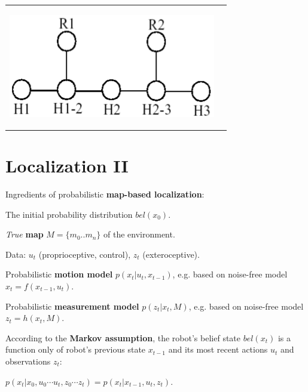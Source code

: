 \documentclass[landscape]{article}
\newcommand{\vmspace}{\vspace{-7pt}}
\newcommand{\vpspace}{\vspace{5pt}}
\newcommand{\vtspace}{\vspace{-10pt}}
\begin{document}
\begin{multicols}{3}
\begin{minipage}{\columnwidth}
\begin{tabular}{p{}p{}}
    \begin{center}
      \includegraphics[width=0.38\columnwidth]{img/8_Topological.png}
    \end{center}


    \\[-15pt]
  \end{tabular}
\end{minipage}


\vfill

\vtspace

\section{Localization II}

\vmspace

\begin{minipage}{\columnwidth}
  Ingredients of probabilistic \textbf{map-based localization}:
  \begin{compactenum}
  \item The initial probability distribution $bel(x_0)$.
  \item \textit{True} \textbf{map} $M = \{m_0.. m_n\}$ of the environment.
  \item Data: $u_t$ (proprioceptive, control), $z_t$ (exteroceptive).
  \item Probabilistic \textbf{motion model} $p(x_t|u_t, x_{t-1})$, e.g. based on
    noise-free model $x_t = f(x_{t-1}, u_t)$.
  \item Probabilistic \textbf{measurement model} $p(z_t|x_t,M)$, e.g. based on
    noise-free model $z_t = h(x_t, M)$.
  \end{compactenum}
\end{minipage}

\vpspace

\begin{minipage}{\columnwidth}
  According to the \textbf{Markov assumption}, the robot's belief state
  $bel(x_t)$ is a function only of robot's previous state $x_{t-1}$ and its most
  recent actions $u_t$ and observations $z_t$:
  \vmspace
  \begin{center}
    $
    p(x_t|x_0, u_0 \cdots u_t, z_0 \cdots z_t)
    =
    p(x_t|x_{t-1}, u_t, z_t).
    $
  \end{center}
\end{minipage}


\end{multicols}
\end{document}
